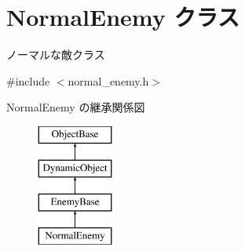 \hypertarget{class_normal_enemy}{}\section{Normal\+Enemy クラス}
\label{class_normal_enemy}


ノーマルな敵クラス  




{\ttfamily \#include $<$normal\+\_\+enemy.\+h$>$}

Normal\+Enemy の継承関係図\begin{figure}[H]
\begin{center}
\leavevmode
\includegraphics[height=4.000000cm]{class_normal_enemy}
\end{center}
\end{figure}
